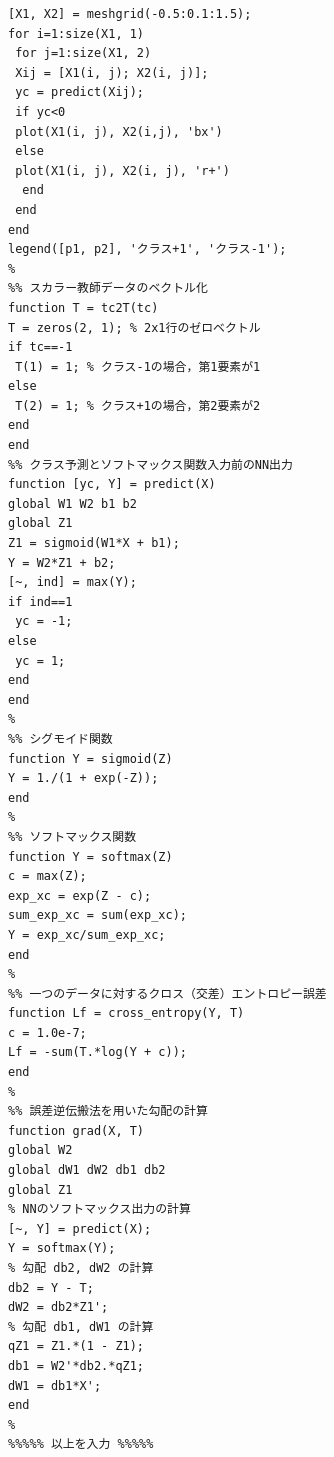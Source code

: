 \documentclass[10pt,a4paper,titlepage]{jreport} %
\begin{document}
\begin{lstlisting}[caption=NN3la3layers]
% ← (B)
[X1, X2] = meshgrid(-0.5:0.1:1.5);
for i=1:size(X1, 1)
 for j=1:size(X1, 2)
 Xij = [X1(i, j); X2(i, j)];
 yc = predict(Xij);
 if yc<0
 plot(X1(i, j), X2(i,j), 'bx')
 else
 plot(X1(i, j), X2(i, j), 'r+')
  end
 end
end
legend([p1, p2], 'クラス+1', 'クラス-1');
%
%% スカラー教師データのベクトル化
function T = tc2T(tc)
T = zeros(2, 1); % 2x1行のゼロベクトル
if tc==-1
 T(1) = 1; % クラス-1の場合，第1要素が1
else
 T(2) = 1; % クラス+1の場合，第2要素が2
end
end
%% クラス予測とソフトマックス関数入力前のNN出力
function [yc, Y] = predict(X)
global W1 W2 b1 b2
global Z1
Z1 = sigmoid(W1*X + b1);
Y = W2*Z1 + b2;
[~, ind] = max(Y);
if ind==1
 yc = -1;
else
 yc = 1;
end
end
%
%% シグモイド関数
function Y = sigmoid(Z)
Y = 1./(1 + exp(-Z));
end
%
%% ソフトマックス関数
function Y = softmax(Z)
c = max(Z);
exp_xc = exp(Z - c);
sum_exp_xc = sum(exp_xc);
Y = exp_xc/sum_exp_xc;
end
%
%% 一つのデータに対するクロス（交差）エントロピー誤差
function Lf = cross_entropy(Y, T)
c = 1.0e-7;
Lf = -sum(T.*log(Y + c));
end
%
%% 誤差逆伝搬法を用いた勾配の計算
function grad(X, T)
global W2
global dW1 dW2 db1 db2
global Z1
% NNのソフトマックス出力の計算
[~, Y] = predict(X);
Y = softmax(Y);
% 勾配 db2, dW2 の計算
db2 = Y - T;
dW2 = db2*Z1';
% 勾配 db1, dW1 の計算
qZ1 = Z1.*(1 - Z1);
db1 = W2'*db2.*qZ1;
dW1 = db1*X';
end
%
%%%%% 以上を入力 %%%%%
\end{lstlisting}
\end{document}
